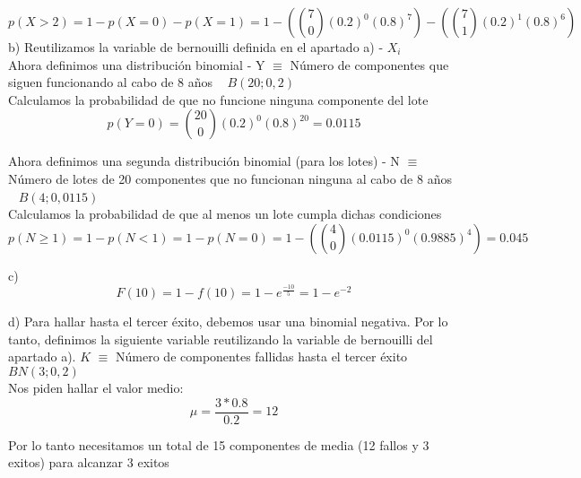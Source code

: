 \documentclass[fleqn]{article}
\begin{document}
	\[
	p(X > 2) = 1 - p(X = 0) - p(X = 1) = \boxed{1 - (\binom{7}{0} (0.2)^{0} (0.8)^{7}) - (\binom{7}{1}(0.2)^{1} (0.8)^{6})}
	\]
	b) Reutilizamos la variable de bernouilli definida en el apartado a) - $X_i$ \\
	
	Ahora definimos una distribución binomial - Y $\equiv$ Número de componentes que siguen funcionando al cabo de 8 años ~ $B(20;0,2)$ \\
	
	Calculamos la probabilidad de que no funcione ninguna componente del lote
	\[
	p(Y = 0) = \binom{20}{0} (0.2)^{0} (0.8)^{20} = 0.0115
	\]
	
	Ahora definimos una segunda distribución binomial (para los lotes) - N $\equiv$ Número de lotes de 20 componentes que no funcionan ninguna al cabo de 8 años ~ $B(4;0,0115)$ \\
	
	Calculamos la probabilidad de que al menos un lote cumpla dichas condiciones
	\[
	p(N \geq 1) = 1 - p(N < 1) = 1 - p(N = 0) = 1 - (\binom{4}{0} (0.0115)^{0} (0.9885)^{4}) = \boxed{0.045}
	\]
	
	c) 
	\[
	F(10) = 1 - f(10) = 1 - e^{\frac{-10}{5}} = \boxed{1 - e^{-2}}
	\]
	
	d) Para hallar hasta el tercer éxito, debemos usar una binomial negativa. Por lo tanto, definimos la siguiente variable reutilizando la variable de bernouilli del apartado a). $K$ $\equiv$ Número de componentes fallidas hasta el tercer éxito ~ $BN(3;0,2)$ \\
	
	Nos piden hallar el valor medio:
	\[
	\mu = \frac{3 * 0.8}{0.2} = 12
	\]
	
	Por lo tanto necesitamos un total de 15 componentes de media (12 fallos y 3 exitos) para alcanzar 3 exitos
\end{document}
